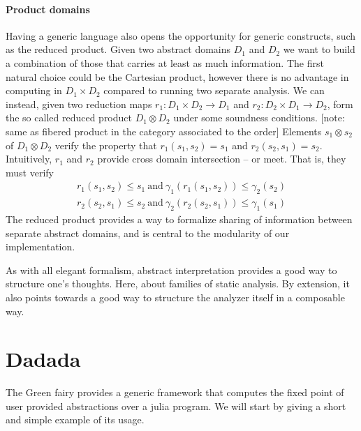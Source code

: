 \documentclass[11pt]{article}
\begin{document}
\paragraph{Product domains} Having a generic language also opens the opportunity for generic constructs, such as the reduced product. Given two abstract domains $D_1$ and $D_2$ we want to build a combination of those that carries at least as much information. The first natural choice could be the Cartesian product, however there is no advantage in computing in $D_1\times D_2$ compared to running two separate analysis. We can instead, given two reduction maps $r_1:D_1\times D_2\to D_1$ and $r_2:D_2\times D_1\to D_2$, form the so called reduced product $D_1 \otimes D_2$ under some soundness conditions. [note: same as fibered product in the category associated to the order] Elements $s_1\otimes s_2$ of $D_1 \otimes D_2$ verify the property that $r_1(s_1,s_2) = s_1$ and $r_2(s_2,s_1) = s_2$. Intuitively, $r_1$ and $r_2$ provide cross domain intersection -- or meet. That is, they must verify
\begin{align*}
r_1(s_1,s_2) \leq s_1~\text{and}~ \gamma_1(r_1(s_1,s_2)) \leq \gamma_2(s_2) \\
r_2(s_2,s_1) \leq s_2~\text{and}~ \gamma_2(r_2(s_2,s_1)) \leq \gamma_1(s_1)
\end{align*}
The reduced product provides a way to formalize sharing of information between separate abstract domains, and is central to the modularity of our implementation.


As with all elegant formalism, abstract interpretation provides a good way to structure one's thoughts. Here, about families of static analysis. By extension, it also points towards a good way to structure the analyzer itself in a composable way.

\section*{Dadada}

The Green fairy provides a generic framework that computes the fixed point of user provided abstractions over a julia program. We will start by giving a short and simple example of its usage.
\end{document}
